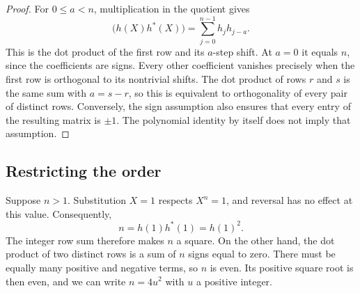 \documentclass[11pt]{article}
\begin{document}
\begin{proof}
For $0\leq a<n$, multiplication in the quotient gives
\begin{equation}
  [X^{a}]\bigl(h(X)h^{*}(X)\bigr)
  =\sum_{j=0}^{n-1}h_{j}h_{j-a}.%
  \label{eq:early-correlation}
\end{equation}
This is the dot product of the first row and its $a$-step shift. At $a=0$
it equals $n$, since the coefficients are signs. Every other coefficient
vanishes precisely when the first row is orthogonal to its nontrivial
shifts. The dot product of rows $r$ and $s$ is the same sum with $a=s-r$,
so this is equivalent to orthogonality of every pair of distinct rows.
Conversely, the sign assumption also ensures that every entry of the
resulting matrix is $\pm1$. The polynomial identity by itself does not
imply that assumption.
\end{proof}

\subsection{Restricting the order}%
\label{sec:proof-order}

Suppose $n>1$. Substitution $X=1$ respects $X^{n}=1$, and reversal has no
effect at this value. Consequently,
\[
  n=h(1)h^{*}(1)={h(1)}^{2}.
\]
The integer row sum therefore makes $n$ a square. On the other hand, the
dot product of two distinct rows is a sum of $n$ signs equal to zero.
There must be equally many positive and negative terms, so $n$ is even.
Its positive square root is then even, and we can write $n=4u^{2}$ with
$u$ a positive integer.
\end{document}
